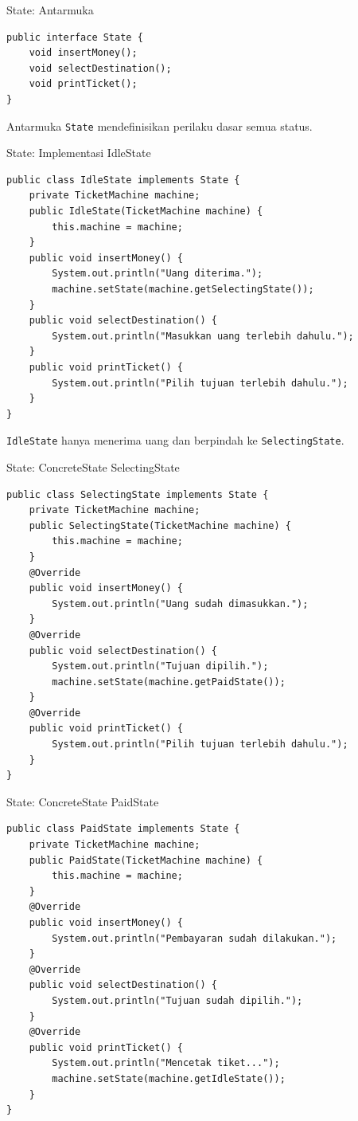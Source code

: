 \documentclass[aspectratio=169, table]{beamer}
\begin{document}
\begin{frame}[fragile]{State: Antarmuka}

\vspace{8pt}
\begin{lstlisting}[style=JavaStyle]
public interface State {
	void insertMoney();
	void selectDestination();
	void printTicket();
}
\end{lstlisting}

\small Antarmuka \texttt{State} mendefinisikan perilaku dasar semua status.
\end{frame}

\begin{frame}[fragile]{State: Implementasi IdleState}
	\vspace{20pt}
\begin{lstlisting}[style=JavaStyle]
public class IdleState implements State {
	private TicketMachine machine;
	public IdleState(TicketMachine machine) {
		this.machine = machine;
	}
	public void insertMoney() {
		System.out.println("Uang diterima.");
		machine.setState(machine.getSelectingState());
	}
	public void selectDestination() {
		System.out.println("Masukkan uang terlebih dahulu.");
	}
	public void printTicket() {
		System.out.println("Pilih tujuan terlebih dahulu.");
	}
}
\end{lstlisting}

\small \texttt{IdleState} hanya menerima uang dan berpindah ke \texttt{SelectingState}.
\end{frame}

\begin{frame}[fragile]{State: ConcreteState SelectingState}
\vspace{20pt}
\begin{lstlisting}[style=JavaStyle]
public class SelectingState implements State {
	private TicketMachine machine;
	public SelectingState(TicketMachine machine) {
		this.machine = machine;
	}
	@Override
	public void insertMoney() {
		System.out.println("Uang sudah dimasukkan.");
	}
	@Override
	public void selectDestination() {
		System.out.println("Tujuan dipilih.");
		machine.setState(machine.getPaidState());
	}
	@Override
	public void printTicket() {
		System.out.println("Pilih tujuan terlebih dahulu.");
	}
}
\end{lstlisting}
\end{frame}

\begin{frame}[fragile]{State: ConcreteState PaidState}
\vspace{20pt}
\begin{lstlisting}[style=JavaStyle]
public class PaidState implements State {
	private TicketMachine machine;
	public PaidState(TicketMachine machine) {
		this.machine = machine;
	}
	@Override
	public void insertMoney() {
		System.out.println("Pembayaran sudah dilakukan.");
	}
	@Override
	public void selectDestination() {
		System.out.println("Tujuan sudah dipilih.");
	}
	@Override
	public void printTicket() {
		System.out.println("Mencetak tiket...");
		machine.setState(machine.getIdleState());
	}
}
\end{lstlisting}
\end{frame}
\end{document}
